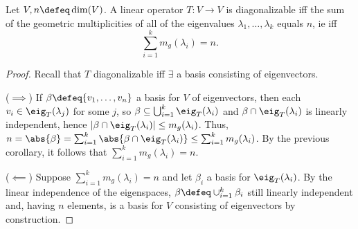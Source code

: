 \begin{theorem}
    Let $V, n \defeq \dim(V)$. A linear operator $T : V \to V$ is diagonalizable iff the sum of the geometric multiplicities of all of the eigenvalues $\lambda_1, \dots, \lambda_k$ equals $n$, ie iff \[
        \sum_{i=1}^k m_g(\lambda_i) = n.
    \]
\end{theorem}

\begin{proof}
    Recall that $T$ diagonalizable iff $\exists$ a basis consisting of eigenvectors. 

    ($\implies$) If $\beta \defeq \{v_1, \dots, v_n\}$ a basis for $V$ of eigenvectors, then each $v_i \in \eig_T(\lambda_j)$  for some $j$, so $\beta\subseteq \bigcup_{i=1}^k \eig_T(\lambda_i)$ and $\beta \cap \eig_T(\lambda_i)$ is linearly independent, hence $|\beta \cap \eig_T(\lambda_i)| \leq m_g(\lambda_i)$. Thus, $n = \abs{\beta} = \sum_{i=1}^k \abs{\beta \cap \eig_T(\lambda_i)} \leq \sum_{i=1}^k m_g(\lambda_i)$. By the previous corollary, it follows that $\sum_{i=1}^k m_g(\lambda_i) = n$.

    ($\impliedby$) Suppose $\sum_{i=1}^k m_g(\lambda_i) = n$ and let $\beta_i$ a basis for $\eig_T(\lambda_i)$. By the linear independence of the eigenspaces, $\beta \defeq \cup_{i=1}^k \beta_i$ still linearly independent and, having $n$ elements, is a basis for $V$ consisting of eigenvectors by construction.
\end{proof}

